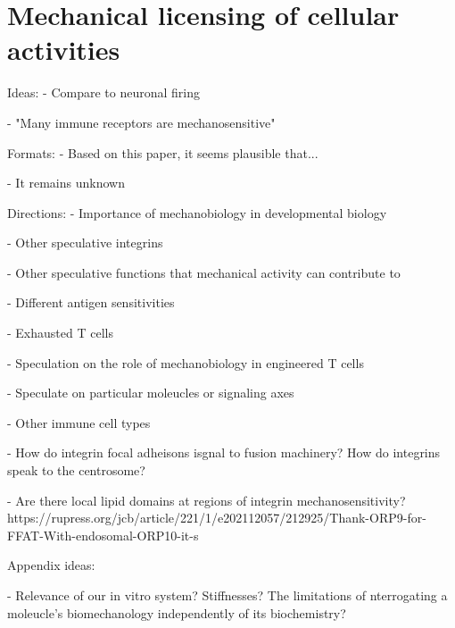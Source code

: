 \section{Mechanical licensing of cellular activities}

Ideas:
- Compare to neuronal firing

- "Many immune receptors are mechanosensitive"

Formats:
- Based on this paper, it seems plausible that...

- It remains unknown 


Directions:
- Importance of mechanobiology in developmental biology

- Other speculative integrins

- Other speculative functions that mechanical activity can contribute to

- Different antigen sensitivities

- Exhausted T cells

- Speculation on the role of mechanobiology in engineered T cells

- Speculate on particular moleucles or signaling axes

- Other immune cell types

- How do integrin focal adheisons isgnal to fusion machinery? How do integrins speak to the centrosome?

- Are there local lipid domains at regions of integrin mechanosensitivity? https://rupress.org/jcb/article/221/1/e202112057/212925/Thank-ORP9-for-FFAT-With-endosomal-ORP10-it-s

Appendix ideas:

- Relevance of our in vitro system? Stiffnesses? The limitations of nterrogating a moleucle's biomechanology independently of its biochemistry?